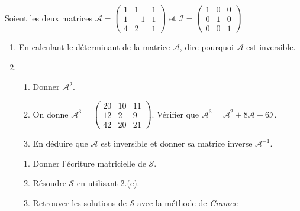 \documentclass[11pt,a4paper]{report}
\begin{document}
\boldmath
\begin{boxhacen}
Soient les deux matrices $\mathcal{A}=
\begin{pmatrix}
1 & 1 & 1 \\ 
1 & -1 & 1 \\ 
4 & 2 & 1
\end{pmatrix} $ et $\mathcal{I}=\begin{pmatrix}
1 & 0 & 0 \\ 
0 & 1 & 0 \\ 
0 & 0 & 1
\end{pmatrix}$
\begin{enumerate}
 \item En calculant le déterminant de la matrice $\mathcal{A}$, dire pourquoi $\mathcal{A}$ est inversible.
 \item 
 \begin{enumerate}
 \item Donner $\mathcal{A}^2.$ \item On donne $\mathcal{A}^3=\begin{pmatrix}
20 & 10 & 11 \\ 
12 & 2 & 9 \\ 
42 & 20 & 21
\end{pmatrix} $. Vérifier que $\mathcal{A}^3 = \mathcal{A}^2 +8\mathcal{A} +6\mathcal{I}$. \item En déduire que $\mathcal{A}$ est inversible et donner sa matrice inverse $\mathcal{A}^{-1}$.

 \end{enumerate}
 
 \begin{enumerate}
 \item Donner l'écriture matricielle de $\mathcal{S}$.
 \item Résoudre $\mathcal{S}$ en utilisant 2.(c).
 \item Retrouver les solutions de $\mathcal{S}$ avec la méthode de {\textsl{Cramer}}.
 \end{enumerate}
\end{enumerate}
 \end{boxhacen}
\end{document}

